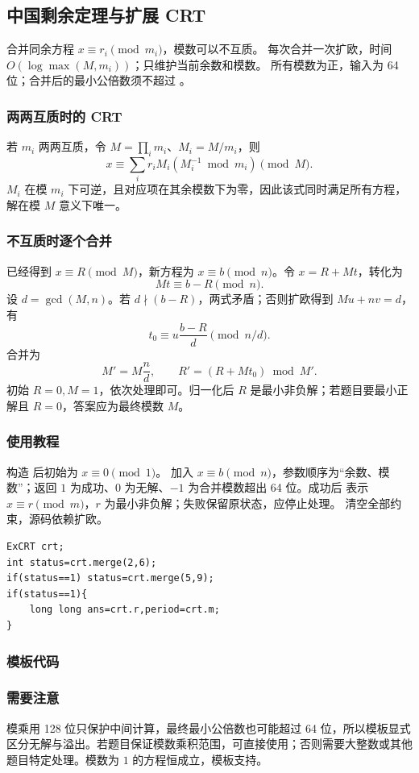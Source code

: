 \subsection{中国剩余定理与扩展 CRT}
\label{algo:excrt}
\AlgorithmInfo
    {合并同余方程 $x\equiv r_i\pmod{m_i}$，模数可以不互质。}
    {每次合并一次扩欧，时间 $O(\log\max(M,m_i))$；只维护当前余数和模数。}
    {所有模数为正，输入为 64 位；合并后的最小公倍数须不超过 。}

\subsubsection*{两两互质时的 CRT}
若 $m_i$ 两两互质，令 $M=\prod_i m_i$、$M_i=M/m_i$，则
\[
    x\equiv\sum_i r_iM_i(M_i^{-1}\bmod m_i)\pmod M.
\]
$M_i$ 在模 $m_i$ 下可逆，且对应项在其余模数下为零，因此该式同时满足所有方程，解在模 $M$ 意义下唯一。

\subsubsection*{不互质时逐个合并}
已经得到 $x\equiv R\pmod M$，新方程为 $x\equiv b\pmod n$。令 $x=R+Mt$，转化为
\[
    Mt\equiv b-R\pmod n.
\]
设 $d=\gcd(M,n)$。若 $d\nmid(b-R)$，两式矛盾；否则扩欧得到 $Mu+nv=d$，有
\[
    t_0\equiv u\frac{b-R}{d}\pmod{n/d}.
\]
合并为
\[
    M'=M\frac nd,\qquad R'=(R+Mt_0)\bmod M'.
\]
初始 $R=0,M=1$，依次处理即可。归一化后 $R$ 是最小非负解；若题目要最小正解且 $R=0$，答案应为最终模数 $M$。

\subsubsection*{使用教程}
构造  后初始为 $x\equiv0\pmod1$。 加入 $x\equiv b\pmod n$，参数顺序为“余数、模数”；返回 $1$ 为成功、$0$ 为无解、$-1$ 为合并模数超出 64 位。成功后  表示 $x\equiv r\pmod m$，$r$ 为最小非负解；失败保留原状态，应停止处理。 清空全部约束，源码依赖扩欧。
\begin{lstlisting}[style=mtycpp,numbers=none]
ExCRT crt;
int status=crt.merge(2,6);
if(status==1) status=crt.merge(5,9);
if(status==1){
	long long ans=crt.r,period=crt.m;
}
\end{lstlisting}

\subsubsection*{模板代码}

\subsubsection*{需要注意}
模乘用 128 位只保护中间计算，最终最小公倍数也可能超过 64 位，所以模板显式区分无解与溢出。若题目保证模数乘积范围，可直接使用；否则需要大整数或其他题目特定处理。模数为 $1$ 的方程恒成立，模板支持。
